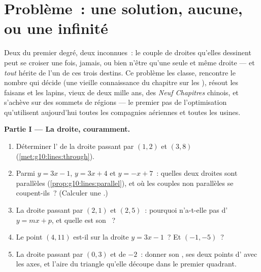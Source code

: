 \section{Problème~: une solution, aucune, ou une infinité}

\begin{problem}
\label{pb:g10:lines:1}
Deux  du premier degré, deux inconnues~: le couple de
droites qu'elles dessinent peut se croiser une fois, jamais, ou bien
n'être qu'une seule et même droite --- et \emph{tout}  hérite de l'un de ces trois destins. Ce problème les
classe, rencontre le nombre qui décide (une vieille connaissance du
chapitre sur les ), résout les faisans et les lapins,
vieux de deux mille ans, des \emph{Neuf Chapitres} chinois, et
s'achève sur des sommets de régions --- le premier pas de
l'optimisation qu'utilisent aujourd'hui toutes les compagnies
aériennes et toutes les usines.

\medskip
\noindent\textbf{Partie I --- La droite, couramment.}
\begin{enumerate}
  \item Déterminer l' de la droite passant par
        $(1, 2)$ et $(3, 8)$ (\cref{met:g10:lines:through}).
  \item Parmi $y = 3x - 1$, $y = 3x + 4$ et $y = -x + 7$~: quelles
        deux droites sont parallèles
        (\cref{prop:g10:lines:parallel}), et où les couples non
        parallèles se coupent-ils~? (Calculer une .)
  \item La droite passant par $(2, 1)$ et $(2, 5)$~: pourquoi
        n'a-t-elle pas d' $y = mx + p$, et quelle
        est son ~?
  \item Le point $(4, 11)$ est-il sur la droite $y = 3x - 1$~? Et
        $(-1, -5)$~?
  \item La droite passant par $(0, 3)$ et de 
        $-2$~: donner son , ses deux points d'
        avec les axes, et l'aire du triangle qu'elle découpe dans le
        premier quadrant.
\end{enumerate}


\end{problem}
